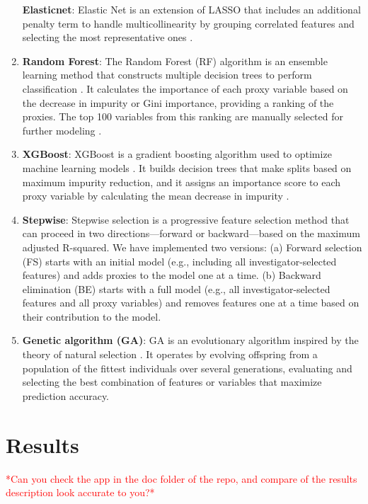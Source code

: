 \documentclass[sn-vancouver,Numbered,lineno,pdflatex]{sn-jnl}
\begin{document}
\begin{enumerate}
  \textbf{Elasticnet}: Elastic Net is an extension of LASSO that
  includes an additional penalty term to handle multicollinearity by
  grouping correlated features and selecting the most representative
  ones \citep{karim2018can}.
\item
  \textbf{Random Forest}: The Random Forest (RF) algorithm is an
  ensemble learning method that constructs multiple decision trees to
  perform classification \citep{breiman2001random}. It calculates the
  importance of each proxy variable based on the decrease in impurity or
  Gini importance, providing a ranking of the proxies. The top 100
  variables from this ranking are manually selected for further modeling
  \citep{schneeweiss2017variable}.
\item
  \textbf{XGBoost}: XGBoost is a gradient boosting algorithm used to
  optimize machine learning models \citep{chen2016xgboost}. It builds
  decision trees that make splits based on maximum impurity reduction,
  and it assigns an importance score to each proxy variable by
  calculating the mean decrease in impurity
  \citep{xiao2024interpretable}.
\item
  \textbf{Stepwise}: Stepwise selection is a progressive feature
  selection method that can proceed in two directions---forward or
  backward---based on the maximum adjusted R-squared. We have
  implemented two versions: (a) Forward selection (FS) starts with an
  initial model (e.g., including all investigator-selected features) and
  adds proxies to the model one at a time. (b) Backward elimination (BE)
  starts with a full model (e.g., all investigator-selected features and
  all proxy variables) and removes features one at a time based on their
  contribution to the model.
\item
  \textbf{Genetic algorithm (GA)}: GA is an evolutionary algorithm
  inspired by the theory of natural selection
  \citep{holland1975adaptation}. It operates by evolving offspring from
  a population of the fittest individuals over several generations,
  evaluating and selecting the best combination of features or variables
  that maximize prediction accuracy.
\end{enumerate}

\section{Results}\label{results}

\textcolor{red}{*Can you check the app in the doc folder of the repo, and compare of the results description look accurate to you?*}
\end{document}
